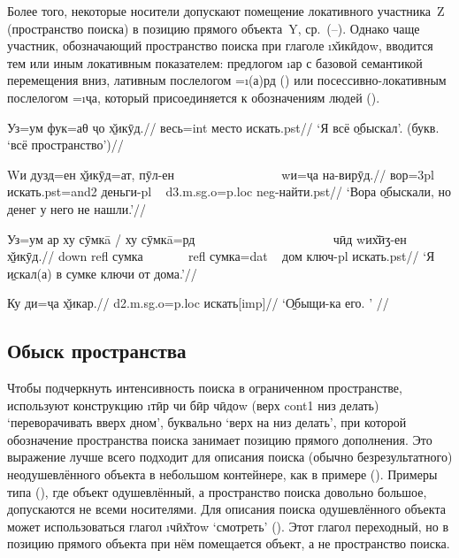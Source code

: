 Более того, некоторые носители допускают помещение локативного участника~Z (пространство поиска) в позицию прямого объекта~Y, ср.~(–). Однако чаще участник, обозначающий пространство поиска при глаголе \i{х̌икӣдоw}, вводится тем или иным локативным показателем: предлогом \i{ар} с базовой семантикой перемещения вниз, лативным послелогом =\i{(а)рд} () или посессивно-локативным послелогом =\i{ҷа}, который присоединяется к обозначениям людей ().

\begingl
\gla {}Уз=ум фук=аθ ҷо \b{х̌икӯд}.//
 весь={\sc int} место искать.{\sc pst}//
\glft ‘Я всё \b{обыскал}’. (букв. ‘всё пространство’)//
\endgl \xe

\begingl
\gla {}Wи дузд=ен \b{х̌икӯд}=ат, пӯл-ен ~~~~~~~~~~~~~~~~ wи=ҷа на-вирӯд.//
 вор={\sc 3pl} искать.{\sc pst=and2} деньги-{\sc pl} ~ {\sc d3.m.sg.o=p.loc} {\sc neg}-найти.{\sc pst}//
\glft ‘Вора \b{обыскали}, но денег у него не нашли.’//
\endgl \xe

\begingl
\gla Уз=ум ар ху сӯмкā / ху сӯмкā=рд ~~~~~~~~~~~~~~~~~~~~~ чӣд wих̌ӣӡ-ен \b{х̌икӯд}.//
 {\sc down} {\sc refl} сумка ~~~~~~ {\sc refl} сумка={\sc dat} ~ дом ключ-{\sc pl} искать.{\sc pst}//
\glft ‘Я \b{искал(а)} в сумке ключи от дома.’//
\endgl \xe

\begingl
\gla Ку ди=ҷа \b{х̌икар}.//
 {\sc d2.m.sg.o=p.loc} искать[{\sc imp}]//
\glft ‘\b{Обыщи}-ка его. ’ //
\endgl \xe

\subsection{Обыск пространства}

Чтобы подчеркнуть интенсивность поиска в ограниченном пространстве, используют конструкцию \i{тӣр чи бӣр чӣдоw} (верх {\sc cont1} низ делать) ‘переворачивать вверх дном’, буквально ‘верх на низ делать’, при которой обозначение пространства поиска занимает позицию прямого дополнения. Это выражение лучше всего подходит для описания поиска (обычно безрезультатного) неодушевлённого объекта в небольшом контейнере, как в примере (). Примеры типа (), где объект одушевлённый, а пространство поиска довольно большое, допускаются не всеми носителями. Для описания поиска одушевлённого объекта может использоваться глагол \i{чӣх̌тоw} ‘смотреть’ (). Этот глагол переходный, но в позицию прямого объекта при нём помещается объект, а не пространство поиска.

